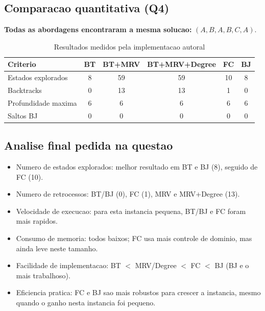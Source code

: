 \subsection{Comparacao quantitativa (Q4)}
\textbf{Todas as abordagens encontraram a mesma solucao:} $(A,B,A,B,C,A)$.
\begin{table}[H]
\centering
\begingroup
\footnotesize
\begin{tabular}{l c c c c c}
\toprule
Criterio & BT & BT+MRV & BT+MRV+Degree & FC & BJ \\
\midrule
Estados explorados & 8 & 59 & 59 & 10 & 8 \\
Backtracks & 0 & 13 & 13 & 1 & 0 \\
Profundidade maxima & 6 & 6 & 6 & 6 & 6 \\
Saltos BJ & 0 & 0 & 0 & 0 & 0 \\
\bottomrule
\end{tabular}
\endgroup
\caption{Resultados medidos pela implementacao autoral}
\end{table}

\subsection{Analise final pedida na questao}
\begin{itemize}[leftmargin=1.5em]
  \item Numero de estados explorados: melhor resultado em BT e BJ (8), seguido de FC (10).
  \item Numero de retrocessos: BT/BJ (0), FC (1), MRV e MRV+Degree (13).
  \item Velocidade de execucao: para esta instancia pequena, BT/BJ e FC foram mais rapidos.
  \item Consumo de memoria: todos baixos; FC usa mais controle de dominio, mas ainda leve neste tamanho.
  \item Facilidade de implementacao: BT $<$ MRV/Degree $<$ FC $<$ BJ (BJ e o mais trabalhoso).
  \item Eficiencia pratica: FC e BJ sao mais robustos para crescer a instancia, mesmo quando o ganho nesta instancia foi pequeno.
\end{itemize}
